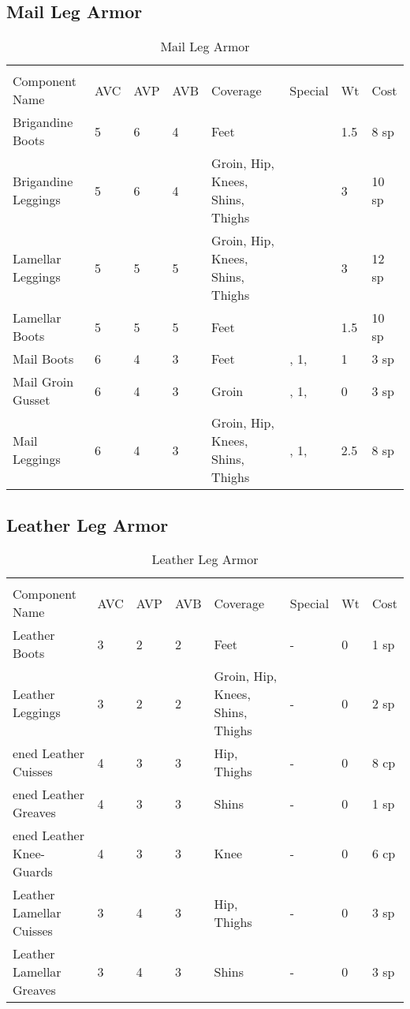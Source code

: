 \documentclass[oneside,11pt,english]{book}
\begin{document}
\subsection{Mail Leg Armor}
\begin{longtabu} to 
	\captionsetup{textformat=empty, labelformat=blank}
	\caption{Mail Leg Armor} \vspace{-15pt}
	\label{tab:Mail Leg Armor}\\
Component Name&AVC&AVP&AVB& Coverage& Special& Wt&Cost\\\toprule
Brigandine Boots& 5& 6& 4& Feet& & 1.5& 8 sp\\
Brigandine Leggings& 5& 6& 4& Groin, Hip, Knees, Shins, Thighs& & 3& 10 sp\\
Lamellar Leggings& 5& 5& 5& Groin, Hip, Knees, Shins, Thighs& & 3& 12 sp\\
Lamellar Boots& 5& 5& 5& Feet& & 1.5& 10 sp\\
Mail Boots& 6& 4& 3& Feet& ,  1, & 1& 3 sp\\
Mail Groin Gusset& 6& 4& 3& Groin& ,  1, & 0& 3 sp\\
Mail Leggings& 6& 4& 3& Groin, Hip, Knees, Shins, Thighs& ,  1, & 2.5& 8 sp\\
\end{longtabu}
\subsection{Leather Leg Armor}
\begin{longtabu} to 
	\captionsetup{textformat=empty, labelformat=blank}
	\caption{Leather Leg Armor} \vspace{-15pt}
	\label{tab:Leather Leg Armor}\\
Component Name&AVC&AVP&AVB& Coverage& Special& Wt&Cost\\\toprule
Leather Boots& 3& 2& 2& Feet& -& 0& 1 sp\\
Leather Leggings& 3& 2& 2& Groin, Hip, Knees, Shins, Thighs& -& 0& 2 sp\\
ened Leather Cuisses& 4& 3& 3& Hip, Thighs& -& 0& 8 cp\\
ened Leather Greaves& 4& 3& 3& Shins& -& 0& 1 sp\\
ened Leather Knee-Guards& 4& 3& 3& Knee& -& 0& 6 cp\\
Leather Lamellar Cuisses& 3& 4& 3& Hip, Thighs& -& 0& 3 sp\\
Leather Lamellar Greaves& 3& 4& 3& Shins& -& 0& 3 sp\\
\end{longtabu}
\end{document}
